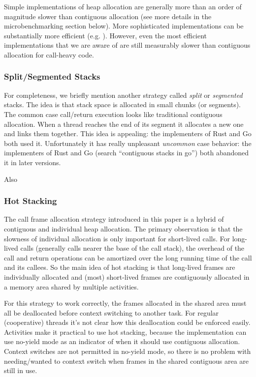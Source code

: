 \documentclass[10pt,preprint]{sigplanconf}
\begin{document}
Simple implementations of heap allocation are generally more than an order of magnitude slower than contiguous allocation (see more details in the microbenchmarking section below).
More sophisticated implementations can be substantially more efficient (e.g. \cite{Shao2000}).
However, even the most efficient implementations that we are aware of are still measurably slower than contiguous allocation for call-heavy code.

\subsubsection{Split/Segmented Stacks}

For completeness, we briefly mention another strategy called \emph{split} or \emph{segmented} stacks.
The idea is that stack space is allocated in small chunks (or segments).
The common case call/return execution looks like traditional contiguous allocation.
When a thread reaches the end of its segment it allocates a new one and links them together.
This idea is appealing: the implementers of Rust and Go both used it.
Unfortunately it has really unpleasant \emph{uncommon} case behavior: the implementers of Rust \cite{Anderson2013} and Go (search ``contiguous stacks in go'') both abandoned it in later versions.

Also \cite{Middha2008}

\subsubsection{Hot Stacking}

The call frame allocation strategy introduced in this paper is a hybrid of contiguous and individual heap allocation.
The primary observation is that the slowness of individual allocation is only important for short-lived calls.
For long-lived calls (generally calls nearer the base of the call stack), the overhead of the call and return operations can be amortized over the long running time of the call and its callees.
So the main idea of hot stacking is that long-lived frames are individually allocated and (most) short-lived frames are contiguously allocated in a memory area shared by multiple activities.

For this strategy to work correctly, the frames allocated in the shared area must all be deallocated before context switching to another task.
For regular (cooperative) threads it's not clear how this deallocation could be enforced easily.
Activities make it practical to use hot stacking, because the implementation can use no-yield mode as an indicator of when it should use contiguous allocation.
Context switches are not permitted in no-yield mode, so there is no problem with needing/wanted to context switch when frames in the shared contiguous area are still in use.
\end{document}
